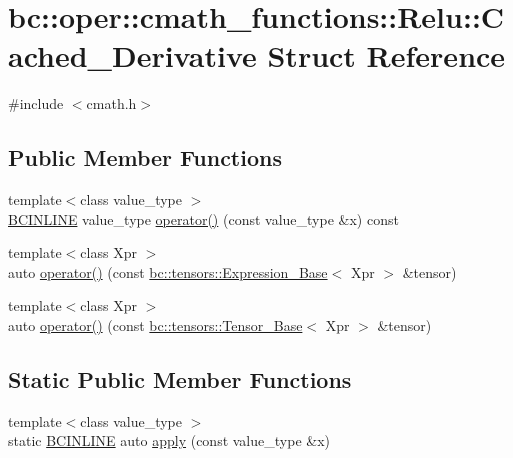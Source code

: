 \hypertarget{structbc_1_1oper_1_1cmath__functions_1_1Relu_1_1Cached__Derivative}{}\section{bc\+:\+:oper\+:\+:cmath\+\_\+functions\+:\+:Relu\+:\+:Cached\+\_\+\+Derivative Struct Reference}
\label{structbc_1_1oper_1_1cmath__functions_1_1Relu_1_1Cached__Derivative}


{\ttfamily \#include $<$cmath.\+h$>$}

\subsection*{Public Member Functions}
\begin{DoxyCompactItemize}
\item 
{\footnotesize template$<$class value\+\_\+type $>$ }\\\hyperlink{common_8h_a6699e8b0449da5c0fafb878e59c1d4b1}{B\+C\+I\+N\+L\+I\+NE} value\+\_\+type \hyperlink{structbc_1_1oper_1_1cmath__functions_1_1Relu_1_1Cached__Derivative_a17a54018106bffd63419d088cee64512}{operator()} (const value\+\_\+type \&x) const
\item 
{\footnotesize template$<$class Xpr $>$ }\\auto \hyperlink{structbc_1_1oper_1_1cmath__functions_1_1Relu_1_1Cached__Derivative_ace2c47bc47db309b6d2a2808e2b084b3}{operator()} (const \hyperlink{classbc_1_1tensors_1_1Expression__Base}{bc\+::tensors\+::\+Expression\+\_\+\+Base}$<$ Xpr $>$ \&tensor)
\item 
{\footnotesize template$<$class Xpr $>$ }\\auto \hyperlink{structbc_1_1oper_1_1cmath__functions_1_1Relu_1_1Cached__Derivative_a70bede1f6a02497b40ae02f04b576c70}{operator()} (const \hyperlink{classbc_1_1tensors_1_1Tensor__Base}{bc\+::tensors\+::\+Tensor\+\_\+\+Base}$<$ Xpr $>$ \&tensor)
\end{DoxyCompactItemize}
\subsection*{Static Public Member Functions}
\begin{DoxyCompactItemize}
\item 
{\footnotesize template$<$class value\+\_\+type $>$ }\\static \hyperlink{common_8h_a6699e8b0449da5c0fafb878e59c1d4b1}{B\+C\+I\+N\+L\+I\+NE} auto \hyperlink{structbc_1_1oper_1_1cmath__functions_1_1Relu_1_1Cached__Derivative_a7686b7734196c992d9444b2a30de959e}{apply} (const value\+\_\+type \&x)
\end{DoxyCompactItemize}



